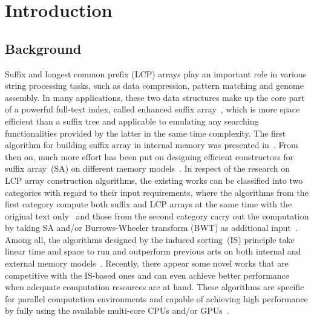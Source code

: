 \documentclass[10pt,journal,compsoc]{IEEEtran}
\begin{document}
\IEEEpeerreviewmaketitle

\section{Introduction}\label{sec:introduction}

\subsection{Background} \label{sec:introduction:background}


Suffix and longest common prefix (LCP) arrays play an important role in various string processing tasks, such as data compression, pattern matching and genome assembly. In many applications, these two data structures make up the core part of a powerful full-text index, called enhanced suffix array~\cite{Abouelhodaa2004}, which is more space efficient than a suffix tree and applicable to emulating any searching functionalities provided by the latter in the same time complexity. The first algorithm for building suffix array in internal memory was presented in~\cite{Manber1993}. From then on, much more effort has been put on designing efficient constructors for suffix array~(SA) on different memory models~\cite{Karkkainen2003, Ko2003, Kim2003, Nong11, Dementiev2008, Ferragina2012, Manzini2004, Bingmann12, Karkkainen2014, Nong14, Nong15}. In respect of the research on LCP array construction algorithms, the existing works can be classified into two categories with regard to their input requirements, where the algorithms from the first category compute both suffix and LCP arrays at the same time with the original text only~\cite{Fischer11, Bingmann12, Flick2015} and those from the second category carry out the computation by taking SA and/or Burrows-Wheeler transform (BWT) as additional input~\cite{Kasai2001,Karkkainen2009, Fischer11, Puglisi2008, Puglisi2008, Deo2013}. Among all, the algorithms designed by the induced sorting~(IS) principle take linear time and space to run and outperform previous arts on both internal and external memory models~\cite{Nong11, Karkkainen2014}. Recently, there appear some novel works that are competitive with the IS-based ones and can even achieve better performance when adequate computation resources are at hand. These algorithms are specific for parallel computation environments and capable of achieving high performance by fully using the available multi-core CPUs and/or GPUs~\cite{Osipov2012, Deo2013, Wang2015, Karkkainen2015, Karkkainen2016}. 
\end{document}
